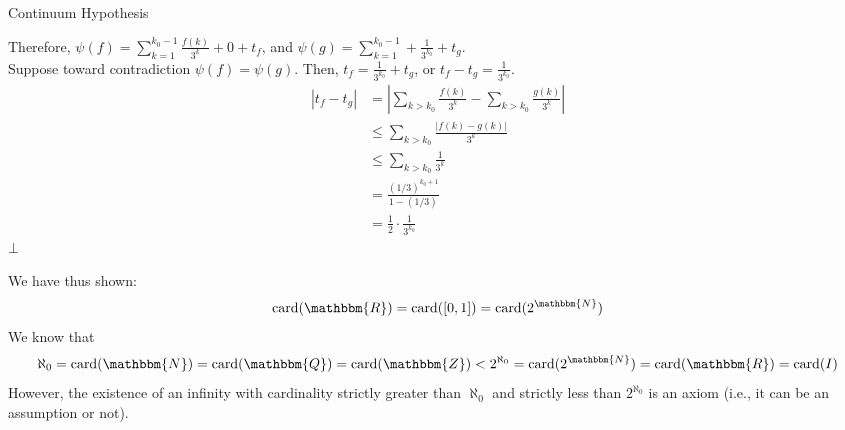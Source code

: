 \documentclass[10pt]{extarticle}
\newcommand{\card}{\text{card}}
\newcommand{\N}{\mathbbm{N}}
\newcommand{\Q}{\mathbbm{Q}}
\newcommand{\Z}{\mathbbm{Z}}
\newcommand{\R}{\mathbbm{R}}
\begin{document}
\begin{problem}{Continuum Hypothesis}
\begin{description}
          Therefore, $\psi(f) = \sum_{k = 1}^{k_0-1}\frac{f(k)}{3^k} + 0 + t_f$, and $\psi(g) = \sum_{k=1}^{k_0-1} + \frac{1}{3^{k_0}} + t_g$.\\

          Suppose toward contradiction $\psi(f) = \psi(g)$. Then, $t_f = \frac{1}{3^{k_0}} + t_g$, or $t_f - t_g = \frac{1}{3^{k_0}}$.
          \begin{align*}
            |t_f-t_g| &= |\sum_{k>k_0}\frac{f(k)}{3^k} - \sum_{k>k_0}\frac{g(k)}{3^k}|\\
                      &\leq \sum_{k>k_0}\frac{|f(k)-g(k)|}{3^k}\\
                      &\leq \sum_{k>k_0}\frac{1}{3^{k}}\\
                      &= \frac{(1/3)^{k_0+1}}{1-(1/3)}\\
                      &= \frac{1}{2}\cdot\frac{1}{3^{k_0}}
          \end{align*}
          $\bot$
    \end{description}
    We have thus shown:
    \[
      \card(\R) = \card([0,1]) = \card(2^{\N})
    \] 
    We know that \[\aleph_0 = \card(\N) = \card(\Q) = \card(\Z) < 2^{\aleph_0} = \card(2^{\N}) = \card(\R) = \card(I)\] However, the existence of an infinity with cardinality strictly greater than $\aleph_0$ and strictly less than $2^{\aleph_0}$ is an axiom (i.e., it can be an assumption or not).
  \end{problem}
\end{document}
